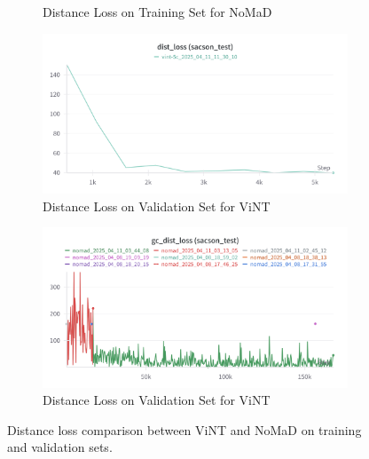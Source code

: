 \documentclass[12pt]{article}
\begin{document}
\begin{figure}[H]
\begin{subfigure}[b]{0.48\textwidth}
        \caption{Distance Loss on Training Set for NoMaD}
        \label{fig:vint_action_loss_val}
    \end{subfigure}
    \begin{subfigure}[b]{0.48\textwidth}
        \centering
        \includegraphics[width=\textwidth]{images/dist_test_vint.png}
        \caption{Distance Loss on Validation Set for ViNT}
        \label{fig:gc_dist_loss_val}
    \end{subfigure}
    \hfill
    \begin{subfigure}[b]{0.48\textwidth}
        \centering
        \includegraphics[width=\textwidth]{images/gc_dist_loss_test.png}
        \caption{Distance Loss on Validation Set for ViNT}
        \label{fig:gc_dist_loss_val_vint}
    \end{subfigure}
    \caption{Distance loss comparison between ViNT and NoMaD on training and validation sets.}
\end{figure}
\end{document}
